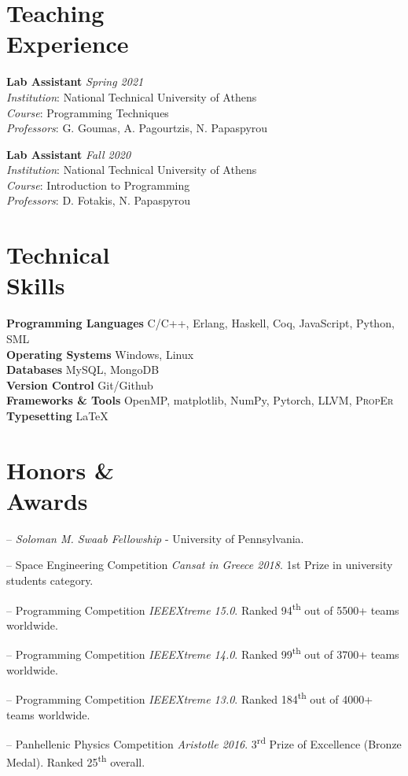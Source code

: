 \documentclass[margin]{res}
\newcommand{\field}[2]{\noindent \textbf{#1} \hfill #2 \\}
\begin{document}
\begin{resume}
\section{Teaching \\ Experience}

\field{Lab Assistant}{\emph{Spring 2021}}
\textit{Institution}: National Technical University of Athens \\
\textit{Course}: Programming Techniques \\
\textit{Professors}: G. Goumas, A. Pagourtzis, N. Papaspyrou

\field{Lab Assistant}{\emph{Fall 2020}}
\textit{Institution}: National Technical University of Athens \\
\textit{Course}: Introduction to Programming \\
\textit{Professors}: D. Fotakis, N. Papaspyrou

\section{Technical \\ Skills}

\field{Programming Languages}  {C/C++, Erlang, Haskell, Coq, JavaScript, Python, SML} 
\field{Operating Systems} {Windows, Linux}
\field{Databases} {MySQL, MongoDB}
\field{Version Control} {Git/Github}
\field{Frameworks \& Tools} {OpenMP, matplotlib, NumPy, Pytorch, LLVM, \textsc{PropEr}}
\field{Typesetting} {\LaTeX}

\section{Honors \& \\ Awards} 

\begin{compactitem}
  \item[--] 
    \emph{Soloman M. Swaab Fellowship} - University of Pennsylvania.
	\item[--] 
    Space Engineering Competition \emph{Cansat in Greece 2018}.
    1st Prize in university students category.
  \item[--] 
    Programming Competition \emph{IEEEXtreme 15.0}.
    Ranked 94\textsuperscript{th} out of 5500+ teams worldwide.
  \item[--] 
    Programming Competition \emph{IEEEXtreme 14.0}.
    Ranked 99\textsuperscript{th} out of 3700+ teams worldwide.
  \item[--] 
    Programming Competition \emph{IEEEXtreme 13.0}.
    Ranked 184\textsuperscript{th} out of 4000+ teams worldwide.
  \item[--] 
    Panhellenic Physics Competition \emph{Aristotle 2016}.
    3\textsuperscript{rd} Prize of Excellence (Bronze Medal). 
    Ranked 25\textsuperscript{th} overall.
\end{compactitem}


\end{resume}
\end{document}
